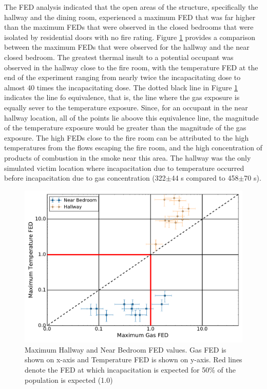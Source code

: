 \documentclass[12pt,oneside]{article}
\begin{document}
The FED analysis indicated that the open areas of the structure, specifically the hallway and the dining room, experienced a maximum FED that was far higher than the maximum FEDs that were observed in the closed bedrooms that were isolated by residential doors with no fire rating. Figure \ref{fig:near_FED_compare} provides a comparison between the maximum FEDs that were observed for the hallway and the near closed bedroom. The greatest thermal insult to a potential occupant was observed in the hallway close to the fire room, with the temperature FED at the end of the experiment ranging from nearly twice the incapacitating dose to almost 40 times the incapacitating dose. The dotted black line in Figure \ref{fig:near_FED_compare} indicates the line fo equivalence, that is, the line where the gas exposure is equally sever to the temperature exposure. Since, for an occupant in the near hallway location, all of the points lie aboove this equivalence line, the magnitude of the temperature exposure would be greater than the magnitude of the gas exposure. The high FEDs close to the fire room can be attributed to the high temperatures from the flows escaping the fire room, and the high concentration of products of combustion in the smoke near this area. The hallway was the only simulated victim location where incapacitation due to temperature occurred before incapacitation due to gas concentration (322$\pm$44 s compared to 458$\pm$70 s).
\begin{figure}[!ht]	
	\centering
	\includegraphics[width=.75\textwidth]{../Figures/br_compare/Near}
	\caption[Maximum Hallway and Near Bedroom FED values]{Maximum Hallway and Near Bedroom FED values. Gas FED is shown on x-axis and Temperature FED is shown on y-axis. Red lines denote the FED at which incapacitation is expected for 50\% of the population is expected (1.0)}
	\label{fig:near_FED_compare}
\end{figure}
\end{document}
